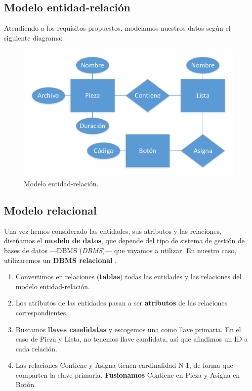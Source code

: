 \subsection{Modelo entidad-relación}

Atendiendo a los requisitos propuestos, modelamos nuestros datos según el siguiente diagrama:

\smallskip

\begin{figure}[H]
	\noindent \begin{centering}
		\includegraphics[width=\linewidth*3/4]{capitulo4/bd_er}
		\par\end{centering}
	\smallskip
	\caption{\label{fig:bd_er} Modelo entidad-relación.}
\end{figure} 

\smallskip

\subsection{Modelo relacional}

Una vez hemos considerado las entidades, sus atributos y las relaciones, diseñamos el \textbf{modelo de datos}, que depende del tipo de sistema de gestión de bases de datos ---\acrshort{DBMS} (\textit{\acrlong{DBMS}})--- que vayamos a utilizar. En nuestro caso, utilizaremos un \textbf{\acrshort{DBMS} relacional} \cite{bdrel}.

\begin{enumerate}
	\item Convertimos en relaciones (\textbf{tablas}) todas las entidades y las relaciones del modelo entidad-relación.
	\item Los atributos de las entidades pasan a ser \textbf{atributos} de las relaciones correspondientes.
	\item Buscamos \textbf{llaves candidatas} y escogemos una como llave primaria. En el caso de Pieza y Lista, no tenemos llave candidata, así que añadimos un ID a cada relación.
	\item Las relaciones Contiene y Asigna tienen cardinalidad N-1, de forma que comparten la clave primaria. \textbf{Fusionamos} Contiene en Pieza y Asigna en Botón.
\end{enumerate}

